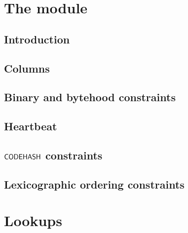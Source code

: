 \section{The \romLexMod{} module}
\subsection{Introduction}                             
\subsection{Columns}                                  
\subsection{Binary and bytehood constraints}          
\subsection{Heartbeat}                                
\subsection{$\textsf{CODEHASH}$ constraints}                        
\subsection{Lexicographic ordering constraints}       
\section{Lookups}

